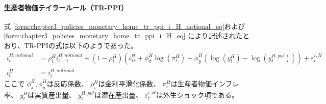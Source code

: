 \paragraph{生産者物価テイラールール（TR-PPI）}
\label{sec:chapter5_beta_shock_policies_tr_ppi}
式
\eqref{form:chapter3_policies_monetary_home_tr_ppi_i_H_notional_eq}および
\eqref{form:chapter3_policies_monetary_home_tr_ppi_i_H_eq}
により記述されたとおり、TR-PPIの式は以下のようであった。
\begin{align}
\label{form:chapter5_beta_shock_policies_tr_ppi_i_H_notional_eq}
    i_t^{H,notional}&=\rho_i^Hi_{t-1}^{H,notional}+(1-\rho_i^H)\left(i_{ss}^H+\phi_{\pi}^H\log(\pi_t^H)+\phi_y^H(\log(y_t^H)-\log(y_t^{H,pot}))\right)+\varepsilon_t^{i,H} \\
\label{form:chapter5_beta_shock_policies_tr_ppi_i_H_eq}
    i_t^H&=i_t^{H,notional}
\end{align}
ここで
\(\phi_{\pi}^H, \phi_y^H\)は反応係数、
\(\rho_i^H\)は金利平滑化係数、
\(\pi_t^H\)は生産者物価インフレ率、
\(y_t^H\)は実質産出量、
\(y_t^{H,pot}\)は潜在産出量、
\(\varepsilon_t^{i,H}\)は外生ショック項である。
